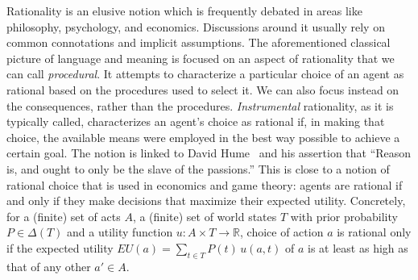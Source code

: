 \documentclass[a4paper]{article}
\begin{document}
Rationality is an elusive notion which is frequently debated in areas like philosophy, psychology, and economics.
Discussions around it usually rely on common connotations and implicit assumptions.
The aforementioned classical picture of language and meaning is focused on an aspect of rationality that we can call \emph{procedural}.
It attempts to characterize a particular choice of an agent as rational based on the procedures used to select it.
We can also focus instead on the consequences, rather than the procedures.
\emph{Instrumental} rationality, as it is typically called, characterizes an agent's choice as rational if, in making that choice, the available means were employed in the best way possible to achieve a certain goal.
The notion is linked to David Hume~\parencite*{hume_treatise_1738} and his assertion that ``Reason is, and ought to only be the slave of the passions.''
This is close to a notion of rational choice that is used in economics and game theory: agents are rational if and only if they make decisions that maximize their expected utility. 
Concretely, for a (finite) set of acts $A$, a (finite) set of world states $T$ with prior probability $P \in \Delta(T)$ and a utility function $u \colon A \times T \rightarrow \mathbb{R}$, choice of action $a$ is rational only if the expected utility $EU(a) = \sum_{t\in T} P(t) \, u(a,t)$ of $a$ is at least as high as that of any other $a' \in A$.
\end{document}
